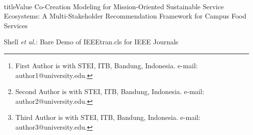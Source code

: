 \documentclass[journal]{IEEEtran}
\begin{document}
%
\\title{Value Co-Creation Modeling for Mission-Oriented Sustainable Service Ecosystems: A Multi-Stakeholder Recommendation Framework for Campus Food Services}
%
%
%

\author{First Author and Second Author and Third Author%
\thanks{First Author is with STEI, ITB, Bandung, Indonesia. e-mail: author1@university.edu.}%
\thanks{Second Author is with STEI, ITB, Bandung, Indonesia. e-mail: author2@university.edu.}%
\thanks{Third Author is with STEI, ITB, Bandung, Indonesia. e-mail: author3@university.edu.}}

%
{Shell \MakeLowercase{\textit{et al.}}: Bare Demo of IEEEtran.cls for IEEE Journals}
% 











\maketitle
\end{document}
